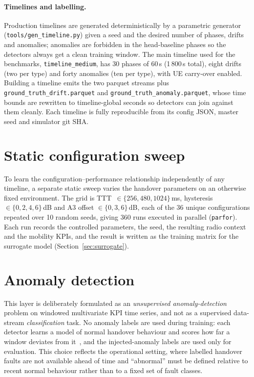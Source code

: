 \paragraph{Timelines and labelling.}
Production timelines are generated deterministically by a parametric generator
(\texttt{tools/gen\_timeline.py}) given a seed and the desired number of phases,
drifts and anomalies; anomalies are forbidden in the head-baseline phases so the
detectors always get a clean training window. The main timeline used for the
benchmarks, \texttt{timeline\_medium}, has 30 phases of 60\,s (1\,800\,s total),
eight drifts (two per type) and forty anomalies (ten per type), with UE
carry-over enabled. Building a timeline emits the two parquet streams plus
\texttt{ground\_truth\_\allowbreak drift.parquet} and
\texttt{ground\_truth\_\allowbreak anomaly.parquet},
whose time bounds are rewritten to timeline-global seconds so detectors can join
against them cleanly. Each timeline is fully reproducible from its config JSON,
master seed and simulator git SHA.

\section{Static configuration sweep}
\label{sec:sweep}

To learn the configuration--performance relationship independently of any
timeline, a separate static sweep varies the handover parameters on an otherwise
fixed environment. The grid is TTT~$\in\{256,480,1024\}$\,ms, hysteresis
$\in\{0,2,4,6\}$\,dB and A3 offset $\in\{0,3,6\}$\,dB, each of the 36 unique
configurations repeated over 10 random seeds, giving 360 runs executed in
parallel (\texttt{parfor}). Each run records the controlled parameters, the seed,
the resulting radio context and the mobility KPIs, and the result is written as
the training matrix for the surrogate model (Section~\ref{sec:surrogate}).

\section{Anomaly detection}
\label{sec:anomaly-method}

This layer is deliberately formulated as an \emph{unsupervised anomaly-detection}
problem on windowed multivariate KPI time series, and not as a supervised
data-stream \emph{classification} task. No anomaly labels are used during
training: each detector learns a model of normal handover behaviour and scores
how far a window deviates from it~\cite{chandola2009anomaly}, and the
injected-anomaly labels are used only for evaluation. This choice reflects the
operational setting, where labelled handover faults are not available ahead of
time and ``abnormal'' must be defined relative to recent normal behaviour rather
than to a fixed set of fault classes.

